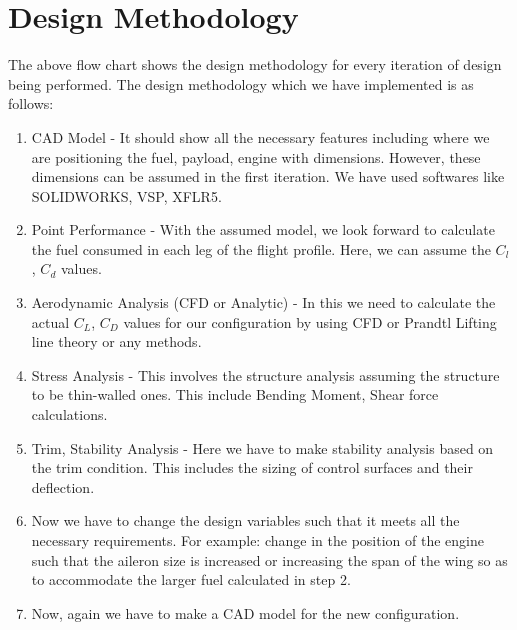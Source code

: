 \chapter{Design Methodology}
\begin{center}
\end{center}
The above flow chart shows the design methodology for every iteration of design being performed.
The design methodology which we have implemented is as follows:
\begin{enumerate}
\item CAD Model - It should show all the necessary features including where we are positioning
the fuel, payload, engine with dimensions. However, these dimensions can be assumed in the
first iteration. We have used softwares like SOLIDWORKS, VSP, XFLR5.
\item  Point Performance - With the assumed model, we look forward to calculate the fuel
consumed in each leg of the flight profile. Here, we can assume the $C_l$, $C_d$ values.
\item Aerodynamic Analysis (CFD or Analytic) - In this we need to calculate the actual $C_L$, $C_D$
values for our configuration by using CFD or Prandtl Lifting line theory or any methods.
\item  Stress Analysis - This involves the structure analysis assuming the structure to be thin-walled
ones. This include Bending Moment, Shear force calculations.
\item Trim, Stability Analysis - Here we have to make stability analysis based on the trim
condition. This includes the sizing of control surfaces and their deflection.
\item  Now we have to change the design variables such that it meets all the necessary
requirements. For example: change in the position of the engine such that the aileron size is
increased or increasing the span of the wing so as to accommodate the larger fuel calculated in
step 2.
\item Now, again we have to make a CAD model for the new configuration.
\end{enumerate}
